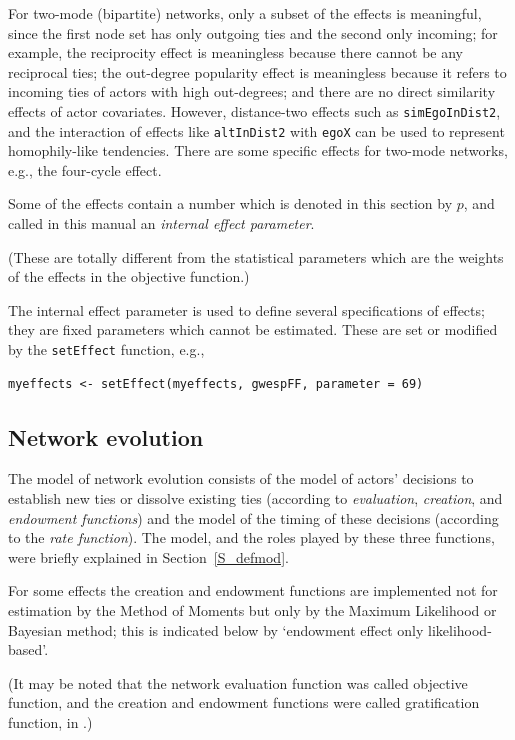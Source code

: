 \documentclass[a4paper,fleqn,11pt]{article}
\newcommand{\+}{\, + \,}
\begin{document}
For two-mode (bipartite) networks, only a subset of the effects is
meaningful, since the first node set has only outgoing ties
and the second only incoming; for example, the reciprocity effect
is meaningless because there cannot be any reciprocal ties;
the out-degree popularity effect is meaningless because it refers to
incoming ties of actors with high out-degrees; and there are no direct
similarity effects of actor covariates. However, distance-two effects
such as \texttt{simEgoInDist2}, and the interaction of effects like
\texttt{altInDist2} with \texttt{egoX} can be used to represent
homophily-like tendencies.
There are some specific effects for two-mode networks, e.g.,
the four-cycle effect.

\hypertarget{T_effpar}{
Some of the effects contain a number which is denoted in this section
by $p$, and called in this manual an \emph{internal effect parameter}.
}
(These are totally different from the statistical parameters which are
the weights of the effects in the objective function.)

The internal effect parameter is used to define several
specifications of effects; they are fixed parameters
which cannot be estimated.
These are set or modified by the \texttt{setEffect} function, e.g.,
\begin{verbatim}
myeffects <- setEffect(myeffects, gwespFF, parameter = 69)
\end{verbatim}

\subsection{Network evolution}
The model of network evolution consists of the model of actors'
decisions to establish new ties or dissolve existing ties
(according to {\it evaluation}, {\it creation},
and {\it endowment functions}) and the
model of the timing of these decisions (according to the {\it rate
function}).
The model, and the roles played by these three functions,
were briefly explained in Section~\ref{S_defmod}.

For some effects
the creation and endowment functions are
implemented not for estimation by the Method of Moments
but only by the Maximum Likelihood or Bayesian method;
this is indicated below by `endowment effect only likelihood-based'.

(It may be noted that the network evaluation function
was called objective function,
and the creation and endowment functions were called gratification function,
in \citet{Snijders01}.)
\end{document}
